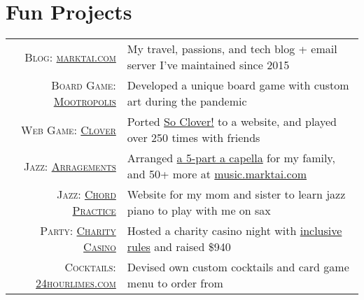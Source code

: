 \documentclass[a4paper,10pt]{article}
\begin{document}
\section{Fun Projects}

\begin{tabular}{r|p{15cm}}
 \textsc{Blog: \href{https://www.marktai.com}{marktai.com}} & My travel, passions, and tech blog + email server I've maintained since 2015 \\
 \textsc{Board Game: \href{http://mootropolis.marktai.com}{Mootropolis}} & Developed a unique board game with custom art during the pandemic \\
 \textsc{Web Game: \href{http://clover.marktai.com}{Clover}} & Ported \href{https://boardgamegeek.com/boardgame/329839/so-clover}{So Clover!} to a website, and played over 250 times with friends \\
 \textsc{Jazz: \href{http://music.marktai.com}{Arragements}} & Arranged \href{http://marktai.com/s/16a8}{a 5-part a capella} for my family, and 50+ more at \href{http://music.marktai.com}{music.marktai.com} \\
 \textsc{Jazz: \href{http://chords.marktai.com/}{Chord Practice}} & Website for my mom and sister to learn jazz piano to play with me on sax \\
 \textsc{Party: \href{http://casino.marktai.com}{Charity Casino}} & Hosted a charity casino night with \href{https://docs.google.com/document/d/1ArbSpuDQg051XyNXSj3txQOdWGhOmlfMKesx0b-BMUE/edit}{inclusive rules} and raised \$940 \\
 \textsc{Cocktails: \href{http://24hourlimes.com}{24hourlimes.com}} & Devised own custom cocktails and card game menu to order from \\
\end{tabular}
\end{document}
